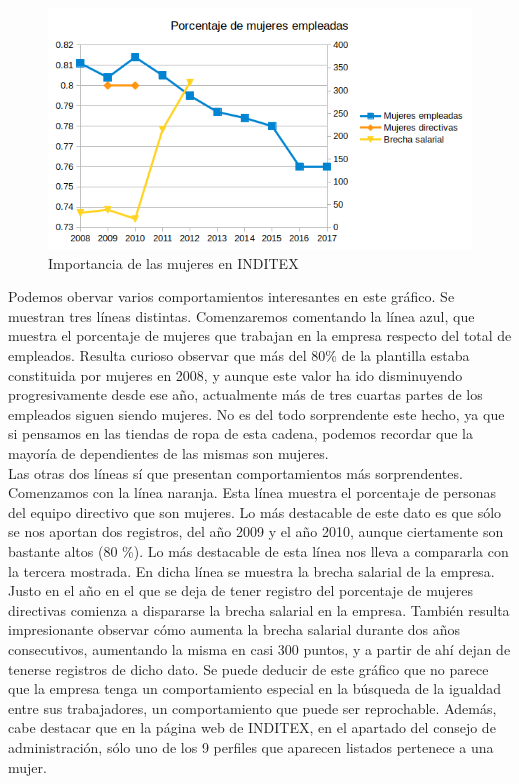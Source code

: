 \documentclass[11pt]{article}
\theoremstyle{plain}
\theoremstyle{definition}
\begin{document}
\begin{figure}[H]
  \centering \includegraphics[width=\textwidth]{graphs/social.png}
  \caption{Importancia de las mujeres en INDITEX}
\end{figure}

Podemos obervar varios comportamientos interesantes en este gráfico.
Se muestran tres líneas distintas. Comenzaremos comentando la línea
azul, que muestra el porcentaje de mujeres que trabajan en la empresa
respecto del total de empleados. Resulta curioso observar que más del
80\% de la plantilla estaba constituida por mujeres en 2008, y aunque
este valor ha ido disminuyendo progresivamente desde ese año,
actualmente más de tres cuartas partes de los empleados siguen siendo
mujeres. No es del todo sorprendente este hecho, ya que si pensamos en
las tiendas de ropa de esta cadena, podemos recordar que
la mayoría de dependientes de las mismas son mujeres.\\

Las otras dos líneas sí que presentan comportamientos más
sorprendentes. Comenzamos con la línea naranja. Esta línea muestra el
porcentaje de personas del equipo directivo que son mujeres. Lo más
destacable de este dato es que sólo se nos aportan dos registros, del
año 2009 y el año 2010, aunque ciertamente son bastante altos (80 \%).
Lo más destacable de esta línea nos lleva a compararla con la tercera
mostrada. En dicha línea se muestra la brecha salarial de la empresa.
Justo en el año en el que se deja de tener registro del porcentaje de
mujeres directivas comienza a dispararse la brecha salarial en la
empresa. También resulta impresionante observar cómo aumenta la brecha
salarial durante dos años consecutivos, aumentando la misma en casi
300 puntos, y a partir de ahí dejan de tenerse registros de dicho
dato. Se puede deducir de este gráfico que no parece que la empresa
tenga un comportamiento especial en la búsqueda de la igualdad entre
sus trabajadores, un comportamiento que puede ser reprochable. Además,
cabe destacar que en la página web de INDITEX, en el apartado del
consejo de administración, sólo uno de los 9 perfiles que aparecen
listados pertenece a una mujer.\\
\end{document}
